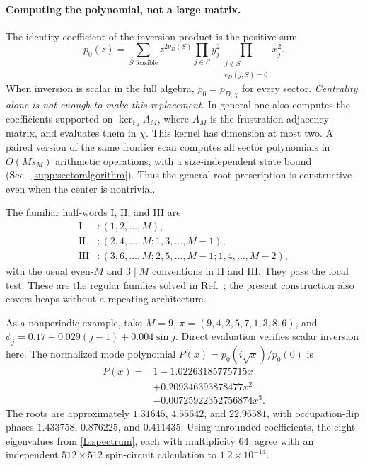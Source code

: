 \documentclass[10pt,letterpaper]{article}
\newcommand{\FF}{\mathbb F_2}
\begin{document}
\paragraph{Computing the polynomial, not a large matrix.}
The identity coefficient of the inversion product is the positive sum
\begin{equation}\label{L:scalar}
 p_0(z)=\sum_{S\text{ feasible}}z^{2\nu_D(S)}
 \prod_{j\in S}y_j^2\!
 \prod_{\substack{j\notin S\\e_D(j,S)=0}}x_j^2.
\end{equation}
When inversion is scalar in the full algebra, $p_0=p_{D,\chi}$ for every sector. \emph{Centrality alone is not enough to make this replacement.} In general one also computes the coefficients supported on $\ker_{\FF}A_M$, where $A_M$ is the frustration adjacency matrix, and evaluates them in $\chi$. This kernel has dimension at most two. A paired version of the same frontier scan computes all sector polynomials in $O(Ms_M)$ arithmetic operations, with a size-independent state bound (Sec.~\ref{supp:sectoralgorithm}). Thus the general root prescription is constructive even when the center is nontrivial.

The familiar half-words I, II, and III are
\begin{equation}\label{L:families}
 \begin{aligned}
 \mathrm I &: (1,2,\ldots,M),\\
 \mathrm {II} &: (2,4,\ldots,M;1,3,\ldots,M-1),\\
 \mathrm {III} &: (3,6,\ldots,M;2,5,\ldots,M-1;1,4,\ldots,M-2),
 \end{aligned}
\end{equation}
with the usual even-$M$ and $3\mid M$ conventions in II and III. They pass the local test. These are the regular families solved in Ref.~\cite{SzaszSchagrinEtAl2026}; the present construction also covers heaps without a repeating architecture.

As a nonperiodic example, take $M=9$, $\pi=(9,4,2,5,7,1,3,8,6)$, and $\phi_j=0.17+0.029(j-1)+0.004\sin j$. Direct evaluation verifies scalar inversion here. The normalized mode polynomial $P(x)=p_0(i\sqrt{x})/p_0(0)$ is
\begin{equation}\label{L:example}
 \begin{aligned}
 P(x)={}&1-1.02263185775715x\\
       &+0.209346393878477x^2\\
       &-0.00725922352756874x^3.
 \end{aligned}
\end{equation}
The roots are approximately $1.31645$, $4.55642$, and $22.96581$, with occupation-flip phases $1.433758$, $0.876225$, and $0.411435$. Using unrounded coefficients, the eight eigenvalues from \eqref{L:spectrum}, each with multiplicity $64$, agree with an independent $512\times512$ spin-circuit calculation to $1.2\times10^{-14}$.
\end{document}

